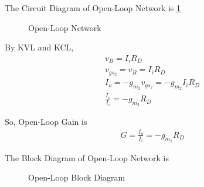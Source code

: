 \begin{enumerate}[label=\thesubsection.\arabic*.,ref=\thesubsection.\theenumi]
The Circuit Diagram of Open-Loop Network is \ref{fig:OpenLoop_Network}
\begin{figure}[ht!]
	\begin{center}
		\resizebox{\columnwidth}{!}{}
	\end{center}
	\caption{Open-Loop Network}
	\label{fig:OpenLoop_Network}
\end{figure}

By KVL and KCL,
\begin{align}
v_{B} = I_{i}R_{D}\\
v_{gs_{2}} = v_{B} = I_{i}R_{D}\\
I_{o} =  -g_{m_{2}}v_{gs_{2}} = -g_{m_{2}}I_{i}R_{D}\\
\frac{I_{o}}{I_{i}} = -g_{m_{2}}R_{D}
\end{align}

So, Open-Loop Gain is
\begin{align}
G = \frac{I_{o}}{I_{i}} =  -g_{m_{2}}R_{D}
\end{align}

The Block Diagram of Open-Loop Network is
\begin{figure}[ht!]
	\begin{center}
		\resizebox{\columnwidth}{!}{}
	\end{center}
	\caption{Open-Loop Block Diagram}
	\label{fig:OpenLoop_Block}
\end{figure}

\end{enumerate}
